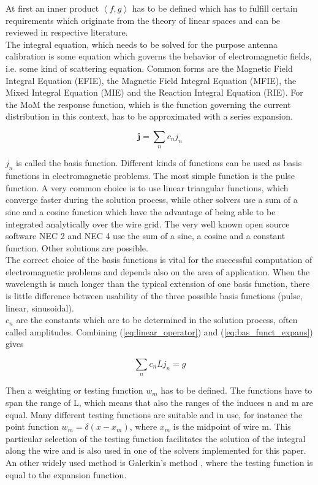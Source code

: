 \documentclass[a4paper,11pt]{report}
\begin{document}
At first an inner product $\left\langle f,g\right\rangle$ has to be defined which has to fulfill certain requirements which originate from the theory of linear spaces and can be reviewed in respective literature.\\

The integral equation, which needs to be solved for the purpose antenna calibration is some equation which governs the behavior of electromagnetic fields, i.e. some kind of scattering equation. Common forms are the Magnetic Field Integral Equation (EFIE), the Magnetic Field Integral Equation (MFIE), the Mixed Integral Equation (MIE) and the Reaction Integral Equation (RIE). For the MoM the response function, which is the function governing the current distribution in this context, has to be approximated with a series expansion.

\begin{equation}\label{eq:bas_funct_expans}
 \mathbf{j}=\sum_{n} c_n j_n
\end{equation}

$j_n$ is called the basis function. Different kinds of functions can be used as basis functions in electromagnetic problems. The most simple function is the pulse function. A very common choice is to use linear triangular functions, which converge faster during the solution process, while other solvers use a sum of a sine and a cosine function which have the advantage of being able to be integrated analytically over the wire grid. The very well known open source software NEC 2 and NEC 4 use the sum of a sine, a cosine and a constant function. Other solutions are possible.\\

The correct choice of the basis functions is vital for the successful computation of electromagnetic problems and depends also on the area of application. When the wavelength is much longer than the typical extension of one basis function, there is little difference between usability of the three possible basis functions (pulse, linear, sinusoidal).\\

$c_n$ are the constants which are to be determined in the solution process, often called amplitudes. Combining (\ref{eq:linear_operator}) and (\ref{eq:bas_funct_expans}) gives

\begin{equation}\label{eq:expanded_func}
 \sum_{n} c_n L j_n=g
\end{equation}

Then a weighting or testing function $w_m$ has to be defined. The functions have to span the range of L, which means that also the ranges of the induces n and m are equal. Many different testing functions are suitable and in use, for instance the point function $w_m=\delta(x-x_m)$, where $x_m$ is the midpoint of wire m. This particular selection of the testing function facilitates the solution of the integral along the wire and is also used in one of the solvers implemented for this paper. An other widely used method is Galerkin's method \cite{harrington}, where the testing function is equal to the expansion function.\\
\end{document}
